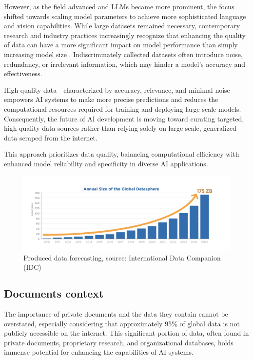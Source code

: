 However, as the field advanced and LLMs became more prominent, the focus shifted towards scaling model parameters to achieve more sophisticated language and vision capabilities. While large datasets remained necessary, contemporary research and industry practices increasingly recognize that enhancing the quality of data can have a more significant impact on model performance than simply increasing model size \cite{bigdatawire2024}. Indiscriminately collected datasets often introduce noise, redundancy, or irrelevant information, which may hinder a model’s accuracy and effectiveness.

High-quality data—characterized by accuracy, relevance, and minimal noise—empowers AI systems to make more precise predictions and reduces the computational resources required for training and deploying large-scale models. Consequently, the future of AI development is moving toward curating targeted, high-quality data sources rather than relying solely on large-scale, generalized data scraped from the internet. 

This approach prioritizes data quality, balancing computational efficiency with enhanced model reliability and specificity in diverse AI applications.


\begin{figure} [H]
    \centering
    \includegraphics[width=0.95\linewidth]{Assets/required_data.png}
    \caption{Produced data forecasting, source: International Data Companion (IDC)}
    \label{fig:enter-label}
\end{figure}
\subsection{Documents context}
The importance of private documents and the data they contain cannot be overstated, especially considering that approximately 95\% of global data is not publicly accessible on the internet. This significant portion of data, often found in private documents, proprietary research, and organizational databases, holds immense potential for enhancing the capabilities of AI systems. 


